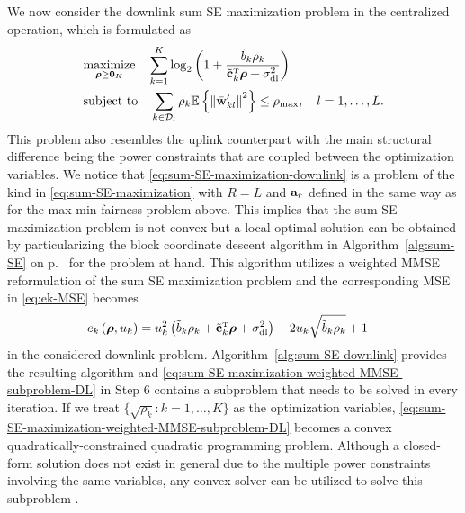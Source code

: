 We now consider the downlink sum SE maximization problem in the centralized operation, which  is formulated as
\begin{align}  \label{eq:sum-SE-maximization-downlink}
&\underset{\boldsymbol{\rho} \geq \vect{0}_K}{\textrm{maximize}} \quad \sum\limits_{k=1}^K  \log_2\left(1+\frac{\tilde{b}_k\rho_k}{\tilde{\vect{c}}_k^{\Ttran}\boldsymbol{\rho}+\sigmaDL}\right) \\
&\textrm{subject to} \quad \sum_{k\in \mathcal{D}_l}\rho_k \mathbb{E} \left\{ \left\| \bar{\vect{w}}_{kl}^{\prime} \right\|^2\right\}\leq \rhomax, \quad l=1,\ldots,L. \nonumber
\end{align}
This problem also resembles the uplink counterpart with the main structural difference being the power constraints that are coupled between the optimization variables. We notice that \eqref{eq:sum-SE-maximization-downlink} is a problem of the kind in \eqref{eq:sum-SE-maximization} with  $R=L$ and $\mathbf{a}_r$ defined in the same way as for the max-min fairness problem above.
This implies that the sum SE maximization problem is not convex but a local optimal solution can be obtained by particularizing the block coordinate descent algorithm in Algorithm~\ref{alg:sum-SE} on p.~\pageref{alg:sum-SE} for the problem at hand. This algorithm utilizes a weighted MMSE reformulation of the sum SE maximization problem and the corresponding MSE in \eqref{eq:ek-MSE} becomes
\begin{align} 
&e_k\left(\boldsymbol{\rho}, u_k\right)=u_{k}^2\left(\tilde{b}_k\rho_k+\tilde{\vect{c}}_k^{\Ttran}\boldsymbol{\rho}+\sigmaDL\right) -2u_{k}\sqrt{\tilde{b}_k\rho_k}+1  \label{eq:ek-MSE-downlink}
\end{align}
in the considered downlink problem. Algorithm~\ref{alg:sum-SE-downlink} provides the resulting algorithm and \eqref{eq:sum-SE-maximization-weighted-MMSE-subproblem-DL} in Step 6 contains a subproblem that needs to be solved in every iteration.
If we treat $\{\sqrt{\rho_k}:k=1,\ldots,K\}$  as the optimization variables, \eqref{eq:sum-SE-maximization-weighted-MMSE-subproblem-DL} becomes a convex quadratically-constrained quadratic programming problem. Although a closed-form solution does not exist in general due to the multiple power constraints involving the same variables, any convex solver can be utilized to solve this subproblem \cite{Boyd2004a}.

